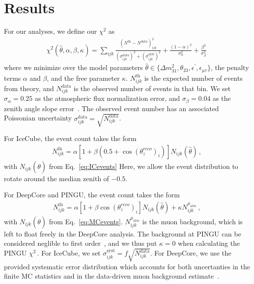 \documentclass[draft=True]{revtex4-2}
\newcommand{\zreco}{\ensuremath{\cos{(\theta_z^{reco})}}}
\newcommand{\emt}{\ensuremath{\epsilon_{\mu\tau}}}
\newcommand{\ep}{\ensuremath{\epsilon^\prime}}
\begin{document}
\section{Results}
For our analyses, we define our $\chi^2$ as
\begin{align} \label{eq:ICchisq}
    \chi^{2}(\hat{\theta},\alpha,\beta, \kappa)=\sum_{ijk} \frac{\left(N^\text{th}-N^\text{data}\right)_{ijk}^{2}}
    {\left(\sigma^\text{data}_{ijk}\right)^{2} + \left(\sigma^\text{syst}_{ijk}\right)^{2}}+ 
    \frac{(1-\alpha)^2}{\sigma_\alpha^2} + \frac{\beta^2}{\sigma_\beta^2}\,
\end{align}
where we minimize over the model parameters $\hat{\theta} \in \{\Delta m_{31}^2, \theta_{23}, \ep, \emt\}$, the penalty terms $\alpha$ and $\beta$, and the free parameter $\kappa$.
$N_{ijk}^\text{th}$ is the expected number of events from theory, and $N_{ijk}^\text{data}$ is the observed number of events in that bin. We set $\sigma_\alpha = 0.25$ as the atmospheric flux normalization error, and $\sigma_\beta = 0.04$ as the zenith angle slope error~\cite{hondapaper}. 
The observed event number has an associated Poissonian uncertainty $\sigma_{ijk}^\text{data} = \sqrt{N_{ijk}^\text{data}}$.

For IceCube, the event count takes the form
\begin{align}
    N^\text{th}_{ijk} = \alpha\left[1+\beta (0.5 + \zreco_i )\right] N_{ijk}(\hat{\theta})\,,
\end{align}
with $N_{ijk}(\hat{\theta})$ from Eq.~\ref{eq:ICevents} Here, we allow the event distribution to rotate around the median zenith of $-0.5$.

For DeepCore and PINGU, the event count takes the form
\begin{align}
    N^\text{th}_{ijk} = \alpha\left[1+\beta \zreco_i \right] N_{ijk}(\hat{\theta}) + \kappa N_{ijk}^{\mu_{atm}}\,,
\end{align}
with $N_{ijk}(\hat{\theta})$ from Eq.~\ref{eq:MCevents}. $N_{ijk}^{\mu_{atm}}$ is the muon background, which is left to float freely in the DeepCore analysis.
The background at PINGU can be considered neglible to first order~\cite{PINGUdata}, and we thus put $\kappa=0$ when calculating the PINGU $\chi^2$\,.
For IceCube, we set $\sigma_{ijk}^\text{syst} = f\sqrt{N_{ijk}^\text{data}}$.
For DeepCore, we use the provided systematic error distribution which accounts for both uncertanties in the finite MC statistics and in the data-driven 
muon background estimate~\cite{DC2019data}.
\end{document}
